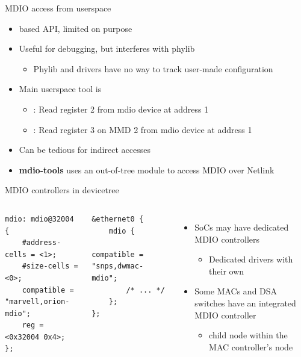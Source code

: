 \begin{frame}{MDIO access from userspace}
	\begin{itemize}
		\item {} based API, limited on purpose
		\item Useful for debugging, but interferes with phylib
			\begin{itemize}
				\item Phylib and drivers have no way to track user-made configuration
			\end{itemize}
		\item Main userspace tool is 
			\begin{itemize}
				\item {} : Read register 2 from mdio device at address 1
				\item {} : Read register 3 on MMD 2 from mdio device at address 1
			\end{itemize}
		\item Can be tedious for indirect accesses
		\item \textbf{mdio-tools} uses an out-of-tree module to access MDIO over Netlink
	\end{itemize}
\end{frame}

\begin{frame}[fragile]{MDIO controllers in devicetree}
	\begin{columns}
		\begin{block}{}
		{\fontsize{9}{10}
			\begin{verbatim}
mdio: mdio@32004 {
    #address-cells = <1>;
    #size-cells = <0>;
    compatible = "marvell,orion-mdio";
    reg = <0x32004 0x4>;
};
			\end{verbatim}
		}
		\end{block}

		\begin{block}{}
			{\fontsize{9}{10}
			\begin{verbatim}
&ethernet0 {
    mdio {
        compatible = "snps,dwmac-mdio";
        /* ... */
    };
};
			\end{verbatim}
			}
		\end{block}
		\begin{itemize}
			\item SoCs may have dedicated MDIO controllers
				\begin{itemize}
					\item Dedicated drivers with their own 
				\end{itemize}
			\item Some MACs and DSA switches have an integrated MDIO controller
				\begin{itemize}
					\item {} child node within the MAC controller's node
				\end{itemize}
		\end{itemize}
	\end{columns}
\end{frame}

